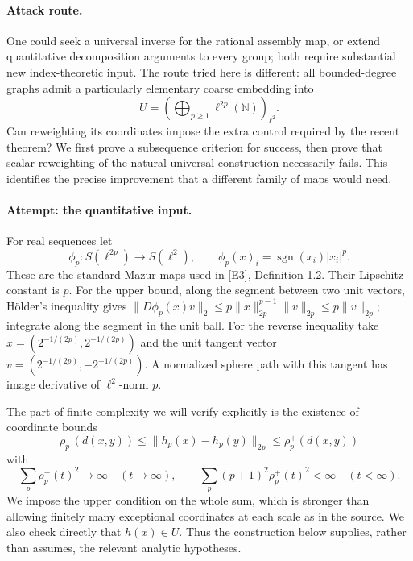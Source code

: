 \documentclass[11pt,a4paper]{article}
\newcommand{\N}{\mathbb{N}}
\newcommand{\eref}[2]{\hyperlink{extra:#1:#2}{[E#2]}}
\numberwithin{equation}{section}
\begin{document}
\paragraph{Attack route.}
One could seek a universal inverse for the rational assembly map, or extend quantitative decomposition arguments to every group; both require substantial new index-theoretic input. The route tried here is different: all bounded-degree graphs admit a particularly elementary coarse embedding into
\[
 U=\left(\bigoplus_{p\geq1}\ell^{2p}(\N)\right)_{\ell^2}.
\]
Can reweighting its coordinates impose the extra control required by the recent theorem? We first prove a subsequence criterion for success, then prove that scalar reweighting of the natural universal construction necessarily fails. This identifies the precise improvement that a different family of maps would need.

\paragraph{Attempt: the quantitative input.}
For real sequences let
\[
 \phi_p:S(\ell^{2p})\longrightarrow S(\ell^2),\qquad
 \phi_p(x)_i=\operatorname{sgn}(x_i)|x_i|^p.
\]
These are the standard Mazur maps used in \eref{30001499}{3}, Definition 1.2. Their Lipschitz constant is $p$. For the upper bound, along the segment between two unit vectors, H\"older's inequality gives
$\|D\phi_p(x)v\|_2\leq p\|x\|_{2p}^{p-1}\|v\|_{2p}\leq p\|v\|_{2p}$; integrate along the segment in the unit ball. For the reverse inequality take
$x=(2^{-1/(2p)},2^{-1/(2p)})$ and the unit tangent vector
$v=(2^{-1/(2p)},-2^{-1/(2p)})$. A normalized sphere path with this tangent has image derivative of $\ell^2$-norm $p$.

The part of finite complexity we will verify explicitly is the existence of coordinate bounds
\begin{equation}\label{r56:bounds}
 \rho_p^-(d(x,y))\leq\|h_p(x)-h_p(y)\|_{2p}
                      \leq\rho_p^+(d(x,y))
\end{equation}
with
\begin{equation}\label{r56:complexity}
 \sum_p\rho_p^-(t)^2\longrightarrow\infty\quad(t\to\infty),
 \qquad
 \sum_p(p+1)^2\rho_p^+(t)^2<\infty\quad(t<\infty).
\end{equation}
We impose the upper condition on the whole sum, which is stronger than allowing finitely many exceptional coordinates at each scale as in the source. We also check directly that $h(x)\in U$. Thus the construction below supplies, rather than assumes, the relevant analytic hypotheses.
\end{document}
